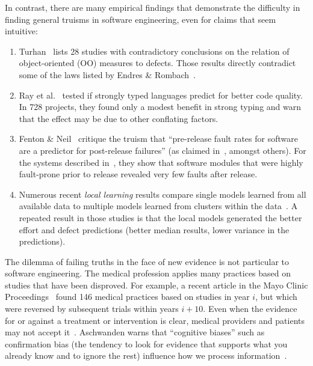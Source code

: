 \documentclass[smallcondensed]{svjour3}
\newcommand{\be}{\begin{enumerate}}
\newcommand{\ee}{\end{enumerate}}
\begin{document}
In contrast, there are many empirical  findings 
that demonstrate the difficulty in finding general truisms in software engineering, even for claims that seem intuitive:

\be
\item
Turhan~\cite{me12d} lists 28 studies with contradictory conclusions
on the relation of object-oriented (OO) measures to defects.  Those results
 directly  contradict some of the laws listed by 
Endres \& Rombach~\cite{endres03}.
\item
Ray et al.~\cite{ray2014lang} tested if   strongly typed languages
predict for better code quality. In  728 projects,
they found  only a modest benefit in strong typing and warn that the effect may be due to other conflating factors.
\item
Fenton \& Neil~\cite{fenton00,fenton00b}   critique the truism that
``pre-release fault rates for software
are a predictor for post-release failures'' (as claimed in~\cite{dunsmore88},
amongst others). For the systems described in~\cite{fenton97}, they
show that software modules that were highly fault-prone
prior to release revealed very few faults after release.
\item
Numerous recent {\em local learning} results compare single models
learned from all available data to multiple models learned from clusters within the data~\cite{betten14,yang11,yang13,minku13,me12d,me11m,betta12,posnett11}.
A repeated result in those studies is that the local models generated the better effort
and defect predictions (better median results,
lower variance in the predictions).
\ee
 
The dilemma of failing truths in the face of new evidence is not particular to software engineering. 
The medical profession applies  many practices based on studies
that have been disproved. For example,
a  recent article
in the Mayo Clinic Proceedings~\cite{prasad13} found  
146 medical practices based on studies 
in year $i$, but which were  reversed by subsequent trials within years $i+10$.
Even when the evidence for or against a treatment or intervention is clear, medical providers and patients may not accept it~\cite{aschwanden10}.
Aschwanden warns that ``cognitive biases''  such as  confirmation bias (the tendency to look for evidence that supports what you already know and to ignore the rest)  influence how we process information~\cite{aschwanden15}.
\end{document}
